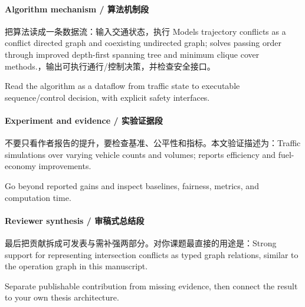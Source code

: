 \documentclass[UTF8,a4paper,11pt,fontset=fandol]{ctexart}
\begin{document}
\paragraph{Algorithm mechanism / 算法机制段}把算法读成一条数据流：输入交通状态，执行 Models trajectory conflicts as a conflict directed graph and coexisting undirected graph; solves passing order through improved depth-first spanning tree and minimum clique cover methods.，输出可执行通行/控制决策，并检查安全接口。

Read the algorithm as a dataflow from traffic state to executable sequence/control decision, with explicit safety interfaces.

\paragraph{Experiment and evidence / 实验证据段}不要只看作者报告的提升，要检查基准、公平性和指标。本文验证描述为：Traffic simulations over varying vehicle counts and volumes; reports efficiency and fuel-economy improvements.

Go beyond reported gains and inspect baselines, fairness, metrics, and computation time.

\paragraph{Reviewer synthesis / 审稿式总结段}最后把贡献拆成可发表与需补强两部分。对你课题最直接的用途是：Strong support for representing intersection conflicts as typed graph relations, similar to the operation graph in this manuscript.

Separate publishable contribution from missing evidence, then connect the result to your own thesis architecture.
\end{document}
